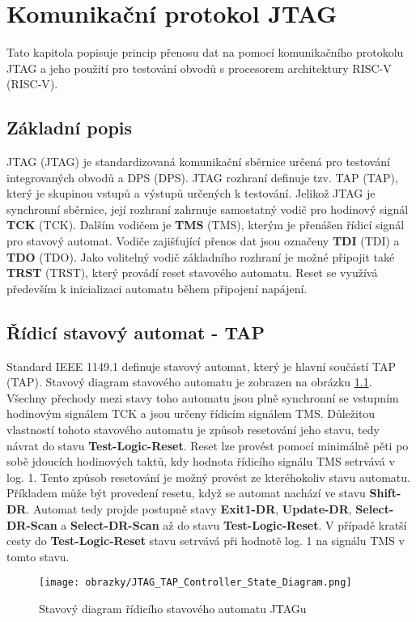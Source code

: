 \chapter{Komunikační protokol JTAG}
Tato kapitola popisuje princip přenosu dat na pomocí komunikačního protokolu JTAG a jeho použití pro testování obvodů s procesorem architektury \acs{RISC-V} (\acl{RISC-V}).

\section{Základní popis}
\acs{JTAG} (\acl{JTAG}) je standardizovaná komunikační sběrnice určená pro testování integrovaných obvodů a \acs{DPS} (\acl{DPS}).
\acs{JTAG} rozhraní definuje tzv. \acs{TAP} (\acl{TAP}), který je skupinou vstupů a výstupů určených k testování. Jelikož \acs{JTAG} je synchronní sběrnice, její rozhraní zahrnuje samostatný vodič pro hodinový signál \textbf{\acs{TCK}} (\acl{TCK}). Dalším vodičem je \textbf{\acs{TMS}} (\acl{TMS}), kterým je přenášen řídicí signál pro stavový automat. Vodiče zajišťující přenos dat jsou označeny \textbf{\acs{TDI}} (\acl{TDI}) a \textbf{\acs{TDO}} (\acl{TDO}). Jako volitelný vodič základního rozhraní je možné připojit také \textbf{\acs{TRST}} (\acl{TRST}), který provádí reset stavového automatu. Reset se využívá především k inicializaci automatu během připojení napájení. \cite {IEEE_1149-1} \cite{JTAG}      

\section{Řídicí stavový automat - \acs{TAP}}
Standard IEEE 1149.1 definuje stavový automat, který je hlavní součástí \acs{TAP} (\acl{TAP}). Stavový diagram stavového automatu je zobrazen na obrázku \ref{fig:tap_controller}. Všechny přechody mezi stavy toho automatu jsou plně synchronní se vstupním hodinovým signálem \acs{TCK} a jsou určeny řídicím signálem \acs{TMS}. Důležitou vlastností tohoto stavového automatu je způsob resetování jeho stavu, tedy návrat do stavu \textbf{Test-Logic-Reset}. Reset lze provést pomocí minimálně pěti po sobě jdoucích hodinových taktů, kdy hodnota řídicího signálu \acs{TMS} setrvává v log. 1. Tento způsob resetování je možný provést ze kteréhokoliv stavu automatu. Příkladem může být provedení resetu, když se automat nachází ve stavu \textbf{Shift-DR}. Automat tedy projde postupně stavy \textbf{Exit1-DR}, \textbf{Update-DR}, \textbf{Select-DR-Scan} a \textbf{Select-DR-Scan} až do stavu \textbf{Test-Logic-Reset}. V případě kratší cesty do \textbf{Test-Logic-Reset} stavu setrvává při hodnotě log. 1 na signálu \acs{TMS} v tomto stavu.
\begin{figure}[H]
  \begin{center}
    \texttt{[image: obrazky/JTAG\_TAP\_Controller\_State\_Diagram.png]}
  \end{center}
  \caption{Stavový diagram řídicího stavového automatu JTAGu \cite{JTAG_TAP_diagram}}
	\label{fig:tap_controller}
\end{figure}


